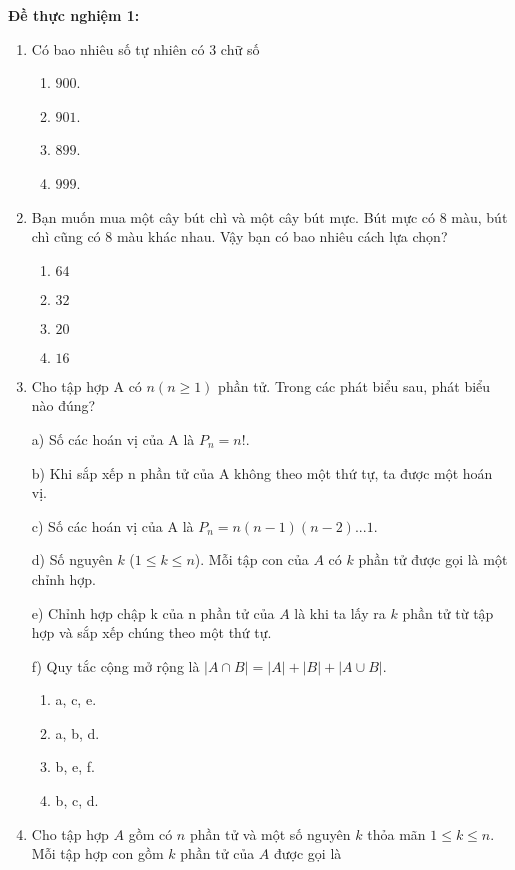 \noindent\textbf{Đề thực nghiệm 1:}\par
\begin{enumerate}[label=\textbf{Câu \arabic*.},align=left,left=0cm..0cm,itemindent=*]
	\item Có bao nhiêu số tự nhiên có 3 chữ số
	\begin{enumerate}[label=\textbf{\Alph*.},align=left,left=1cm..0cm,itemindent=*]
		\item $900$. \item $901$. \item $899$. \item $999$.
	\end{enumerate}
	\item Bạn muốn mua một cây bút chì và một cây bút mực. Bút mực có 8 màu, bút chì cũng có 8 màu khác nhau. Vậy bạn có bao nhiêu cách lựa chọn?
	\begin{enumerate}[label=\textbf{\Alph*.},align=left,left=1cm..0cm,itemindent=*]
		\item $64$ \item $32$ \item $20$ \item $16$
	\end{enumerate}
	\item Cho tập hợp A có $n (n\geqslant 1)$ phần tử. Trong các phát biểu sau, phát biểu nào đúng?\par
	a) Số các hoán vị của A là $P_n=n!$.\par
	b) Khi sắp xếp n phần tử của A không theo một thứ tự, ta được một hoán vị.\par
	c) Số các hoán vị của A là $P_n=n(n-1)(n-2)...1$.\par
	d) Số nguyên $k$ ($1\leqslant k\leqslant n$). Mỗi tập con của $A$ có $k$ phần tử được gọi là một chỉnh hợp.\par
	e) Chỉnh hợp chập k của n phần tử của $A$ là khi ta lấy ra $k$ phần tử từ tập hợp và sắp xếp chúng theo một thứ tự.\par
	f) Quy tắc cộng mở rộng là $|A\cap B|=|A|+|B|+|A\cup B|.$
	\begin{enumerate}[label=\textbf{\Alph*.},align=left,left=1cm..0cm,itemindent=*]
		\item a, c, e. \item a, b, d. \item b, e, f. \item b, c, d.
	\end{enumerate}
	\item Cho tập hợp $A$ gồm có $n$ phần tử và một số nguyên $k$ thỏa mãn $1\leqslant k\leqslant n$. Mỗi tập hợp con gồm $k$ phần tử của $A$ được gọi là

\end{enumerate}
